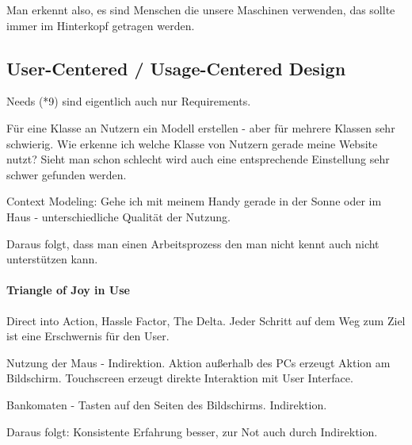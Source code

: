 Man erkennt also, es sind Menschen die unsere Maschinen verwenden, das sollte immer
im Hinterkopf getragen werden.

\subsection{User-Centered / Usage-Centered Design}

Needs (*9) sind eigentlich auch nur Requirements.

Für eine Klasse an Nutzern ein Modell erstellen - aber für mehrere Klassen sehr 
schwierig. Wie erkenne ich welche Klasse von Nutzern gerade meine Website nutzt?
Sieht man schon schlecht wird auch eine entsprechende Einstellung sehr schwer
gefunden werden.

Context Modeling: Gehe ich mit meinem Handy gerade in der Sonne oder im Haus - 
unterschiedliche Qualität der Nutzung.

\noindent{}

Daraus folgt, dass man einen Arbeitsprozess den man nicht kennt auch nicht
unterstützen kann.

\paragraph{Triangle of Joy in Use}

Direct into Action, Hassle Factor, The Delta. Jeder Schritt auf dem Weg zum Ziel
ist eine Erschwernis für den User.

Nutzung der Maus - Indirektion. Aktion außerhalb des PCs erzeugt Aktion am Bildschirm.
Touchscreen erzeugt direkte Interaktion mit User Interface.

Bankomaten - Tasten auf den Seiten des Bildschirms. Indirektion. 

\noindent{}

Daraus folgt: Konsistente Erfahrung besser, zur Not auch durch Indirektion.
